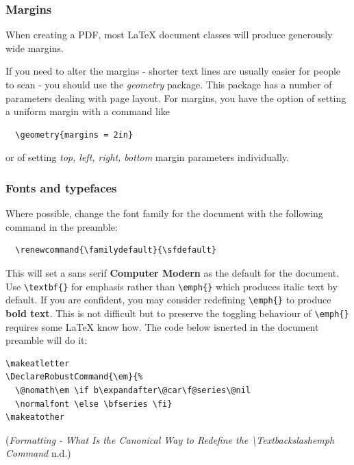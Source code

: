 \documentclass[]{article}
\makeatletter
\renewcommand{\familydefault}{\sfdefault}
\DeclareRobustCommand{\em}{%
  \@nomath\em \if b\expandafter\@car\f@series\@nil
  \normalfont \else \bfseries \fi}
\makeatother
\begin{document}
\hypertarget{margins}{%
\subsubsection{Margins}\label{margins}}

When creating a PDF, most \LaTeX{} document classes will produce generously wide margins.

If you need to alter the margins - shorter text lines are usually easier for people to scan - you should use the \emph{geometry} package.  This package has a number of parameters dealing with page layout.  For margins, you have the option of setting a uniform margin with a command like

\begin{verbatim}
  \geometry{margins = 2in}
\end{verbatim}

or of setting \emph{top, left, right, bottom} margin parameters individually.

\hypertarget{fonts-and-typefaces}{%
\subsubsection{Fonts and typefaces}\label{fonts-and-typefaces}}

Where possible, change the font family for the document with the
following command in the preamble:

\begin{verbatim}
  \renewcommand{\familydefault}{\sfdefault}
\end{verbatim}

This will set a sans serif \textbf{Computer Modern} as the default for
the document. Use \texttt{\textbackslash{}textbf\{\}} for emphasis
rather than \texttt{\textbackslash{}emph\{\}} which produces italic text
by default. If you are confident, you may consider redefining
\texttt{\textbackslash{}emph\{\}} to produce \textbf{bold text}. This is
not difficult but to preserve the toggling behaviour of
\texttt{\textbackslash{}emph\{\}} requires some LaTeX know how. The code
below isnerted in the document preamble will do it:

\begin{verbatim}
\makeatletter
\DeclareRobustCommand{\em}{%
  \@nomath\em \if b\expandafter\@car\f@series\@nil
  \normalfont \else \bfseries \fi}
\makeatother
\end{verbatim}

(\emph{Formatting - What Is the Canonical Way to Redefine the
\textbackslash{}Textbackslashemph Command} n.d.)
\end{document}
